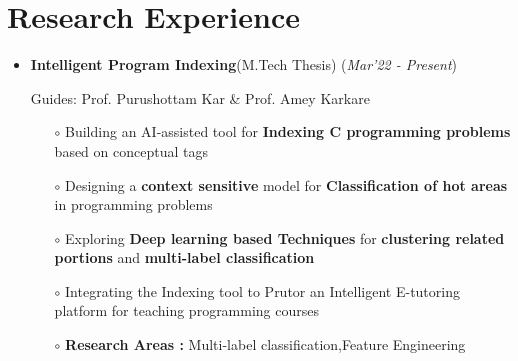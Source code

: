 \documentclass[10.8pt, a4paper]{extarticle}
\newcommand{\shorterSection}[1]{\vspace{-10pt}\section{#1}}
\begin{document}
\shorterSection{Research Experience}
\vspace{-2pt}
\begin{itemize}
\item \textbf{Intelligent Program Indexing}(M.Tech Thesis)
\hfill\hfill(\textit{Mar'22 - Present})

Guides: Prof. Purushottam Kar \& Prof. Amey Karkare
\begin{itemize}
          \item[$\circ$] Building an AI-assisted tool for \textbf{Indexing C programming problems} based on conceptual tags\\[-0.6cm]
          
          \item[$\circ$] Designing a \textbf{context sensitive} model for \textbf{Classification of hot areas} in programming problems \\[-0.6cm]
          \item[$\circ$] Exploring \textbf {Deep learning based Techniques} for \textbf {clustering related portions} and \textbf{multi-label classification}\\[-0.6cm]
          \item[$\circ$] Integrating the Indexing tool to Prutor an Intelligent E-tutoring platform for teaching programming courses\\[-0.6cm]
          \item[$\circ$] \textbf{Research Areas :} Multi-label classification,Feature Engineering
          
    \end{itemize}
\end{itemize}
\medskip
\end{document}
